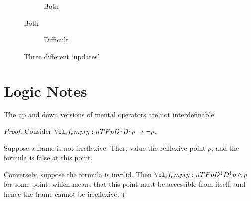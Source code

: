 \documentclass[10pt]{article}
\begin{document}
\begin{figure}[ht]
  \centering
  \begin{subfigure}[b]{0.3\textwidth}
    \caption{Both}
  \end{subfigure}
\end{figure}




\begin{figure}[ht]
  \centering
  \begin{subfigure}[b]{0.3\textwidth}
    \caption{Difficult}
  \end{subfigure}
  \caption{Three different `updates'}
\end{figure}



\newpage


\section{Logic Notes}
\label{sec:logic-notes}

\begin{proposition}
  The up and down versions of mental operators are not interdefinable.
  \begin{proof}
    Consider \(\ldesd{p} \rightarrow \lnot p\).

    Suppose a frame is not irreflexive. Then, value the relflexive point \(p\), and the formula is false at this point.

    Conversely, suppose the formula is invalid.
    Then \(\ldesd{p} \land p\) for some point, which means that this point must be accessible from itself, and hence the frame cannot be irreflexive.
  \end{proof}
\end{proposition}
\end{document}
